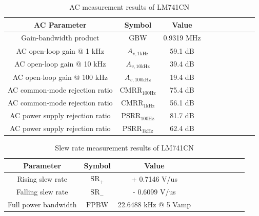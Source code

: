 \documentclass[UTF8]{article}
\begin{document}
\begin{table}[H]\centering
    \caption{AC measurement results of LM741CN}
\begin{tabular}{cccccccccc}
    \toprule
    AC Parameter & Symbol & Value \\
    \midrule
    Gain-bandwidth product           & $\mathrm{GBW}$                   & 0.9319 MHz \\
    AC open-loop gain @ 1 kHz        & $A_{v,\mathrm{1kHz}}$            & 59.1 dB \\
    AC open-loop gain @ 10 kHz       & $A_{v,\mathrm{10kHz}}$           & 39.4 dB \\
    AC open-loop gain @ 100 kHz      & $A_{v,\mathrm{100kHz}}$          & 19.4 dB \\
    AC common-mode rejection ratio   & $\mathrm{CMRR}_{\mathrm{100Hz}}$ & 75.4 dB \\
    AC common-mode rejection ratio   & $\mathrm{CMRR}_{\mathrm{1kHz}}$  & 56.1 dB \\
    AC power supply rejection ratio  & $\mathrm{PSRR}_{\mathrm{100Hz}}$ & 81.7 dB \\
    AC power supply rejection ratio  & $\mathrm{PSRR}_{\mathrm{1kHz}}$  & 62.4 dB \\
    \bottomrule
\end{tabular}
\end{table}

\begin{table}[H]\centering
    \caption{Slew rate measurement results of LM741CN}
\begin{tabular}{cccccccccc}\toprule
    Parameter & Symbol & Value \\
    \midrule
    Rising slew rate                 & $\mathrm{SR}_+$         &  + 0.7146 V/us \\
    Falling slew rate                & $\mathrm{SR}_-$         &  - 0.6099 V/us \\
    Full power bandwidth            & $\mathrm{FPBW}$          &  22.6488 kHz @ 5 Vamp \\
    \bottomrule
\end{tabular}
\end{table}
\end{document}
